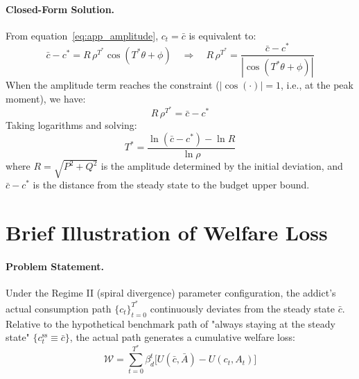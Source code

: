 \documentclass[12pt]{article}
\begin{document}
\paragraph{Closed-Form Solution.}
From equation~\eqref{eq:app_amplitude}, $c_t = \bar{c}$ is equivalent to:
\begin{equation}
\bar{c} - c^* = R\,\rho^{T^*}\cos(T^*\theta + \phi)
\quad \Rightarrow \quad
R\,\rho^{T^*} = \frac{\bar{c} - c^*}{|\cos(T^*\theta + \phi)|}
\end{equation}
When the amplitude term reaches the constraint ($|\cos(\cdot)| = 1$, i.e., at the peak moment), we have:
\begin{equation}
R\,\rho^{T^*} = \bar{c} - c^*
\end{equation}
Taking logarithms and solving:
\begin{equation}\label{eq:app_Tstar}
\boxed{T^* = \frac{\ln(\bar{c} - c^*) - \ln R}{\ln\rho}}
\end{equation}
where $R = \sqrt{P^2 + Q^2}$ is the amplitude determined by the initial deviation,
and $\bar{c} - c^*$ is the distance from the steady state to the budget upper bound.

\section{Brief Illustration of Welfare Loss}
\label{app:welfare}

\paragraph{Problem Statement.}
Under the Regime II (spiral divergence) parameter configuration, the addict's actual consumption path
$\{c_t\}_{t=0}^{T^*}$ continuously deviates from the steady state $\bar{c}$.
Relative to the hypothetical benchmark path of "always staying at the steady state"
$\{c_t^{\text{ss}} \equiv \bar{c}\}$,
the actual path generates a cumulative welfare loss:
\begin{equation}\label{eq:app_welfare_loss}
\mathcal{W} = \sum_{t=0}^{T^*} \beta_d^t
\bigl[U(\bar{c}, \bar{A}) - U(c_t, A_t)\bigr]
\end{equation}
\end{document}
